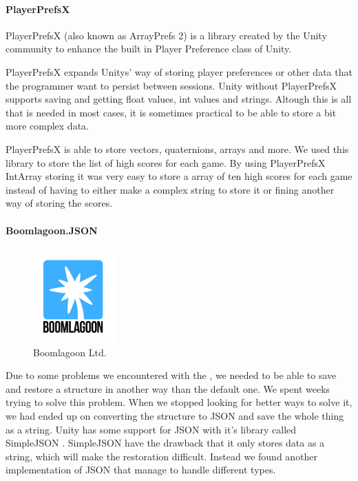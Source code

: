 \paragraph{PlayerPrefsX}
PlayerPrefsX (also known as ArrayPrefs 2)\cite{PlayerPrefsX} is a library created by the Unity community to enhance the built in Player Preference class of Unity.

PlayerPrefsX expands Unitys' way of storing player preferences or other data that the programmer want to persist between sessions.
Unity without PlayerPrefsX supports saving and getting float values, int values and strings. Altough this is all that is needed in most cases, it is sometimes practical to be able to store a bit more complex data.

PlayerPrefsX is able to store vectors, quaternions, arrays and more. 
We used this library to store the list of high scores for each game. 
By using PlayerPrefsX IntArray storing it was very easy to store a array of ten high scores for each game instead of having to either make a complex string to store it or fining another way of storing the scores.

\paragraph{Boomlagoon.{JSON}}

\begin{figure}
	\capstart
	\centering
	\vspace{-20pt}
	\includegraphics[width=0.28\textwidth]{images/Boomlagoon.png}
	\vspace{-20pt}
	\caption[Boomlagoon {L}td.]{Boomlagoon {L}td.}
	\label{fig:boomlagoon}
	\vspace{-10pt}
\end{figure}

Due to some problems we encountered with the ,
we needed to be able to save and restore a structure in another way than the
default one. We spent weeks trying to solve this problem. When we stopped
looking for better ways to solve it, we had ended up on converting the 
structure to {JSON} and save the whole thing as a string.
Unity has some support for {JSON} with it's library called Simple{JSON} 
\cite{SimpleJSON}. Simple{JSON} have the drawback that it only stores data
as a string, which will make the restoration difficult. Instead we found
another implementation of JSON that manage to handle different types.

